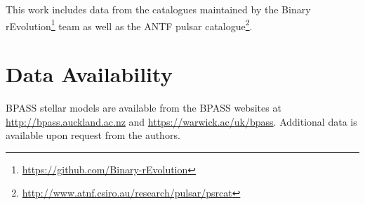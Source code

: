 \documentclass{pas}
\begin{document}
This work includes data from the catalogues maintained by the Binary rEvolution\footnote{\url{https://github.com/Binary-rEvolution}} team as well as the ANTF pulsar catalogue\footnote{\url{http://www.atnf.csiro.au/research/pulsar/psrcat}}. \citep{Manchester_2005}
\section*{Data Availability}\label{data_avail}

 
\textsc{BPASS} stellar models are available from the \textsc{BPASS} websites at \url{http://bpass.auckland.ac.nz} and \url{https://warwick.ac/uk/bpass}. Additional data is available upon request from the authors.

% 

\end{document}

